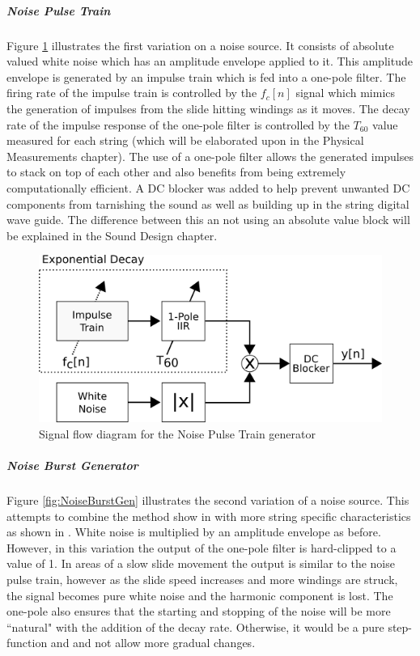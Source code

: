 \documentclass[../main.tex]{subfiles}
\begin{document}
\subparagraph{Noise Pulse Train}
Figure \ref{fig:NoisePulseTrain} illustrates the first variation on a noise source. It consists of absolute valued white noise which has an amplitude envelope applied to it. This amplitude envelope is generated by an impulse train which is fed into a one-pole filter. The firing rate of the impulse train is controlled by the $f_c[n]$ signal which mimics the generation of impulses from the slide hitting windings as it moves. The decay rate of the impulse response of the one-pole filter is controlled by the $T_{60}$ value measured for each string (which will be elaborated upon in the Physical Measurements chapter). The use of a one-pole filter allows the generated impulses to stack on top of each other and also benefits from being extremely computationally efficient. A DC blocker was added to help prevent unwanted DC components from tarnishing the sound as well as building up in the string digital wave guide. The difference between this an not using an absolute value block will be explained in the Sound Design chapter.

\begin{figure}[h]
    \centering
    \includegraphics[scale=.5]{./images/diagrams/NoisePulseTrain.png}
    \caption{Signal flow diagram for the Noise Pulse Train generator}
    \label{fig:NoisePulseTrain}
\end{figure}

\subparagraph{Noise Burst Generator}
Figure \ref{fig:NoiseBurstGen} illustrates the second variation of a noise source. This attempts to combine the method show in  with more string specific characteristics as shown in . White noise is multiplied by an amplitude envelope as before. However, in this variation the output of the one-pole filter is hard-clipped to a value of 1. In areas of a slow slide movement the output is similar to the noise pulse train, however as the slide speed increases and more windings are struck, the signal becomes pure white noise and the harmonic component is lost. The one-pole also ensures that the starting and stopping of the noise will be more ``natural" with the addition of the decay rate. Otherwise, it would be a pure step-function and and not allow more gradual changes.
\end{document}
